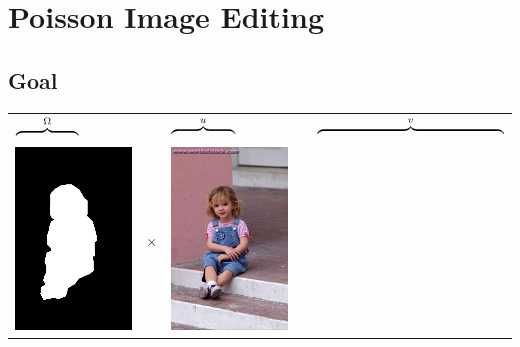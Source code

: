 \documentclass{beamer}
\begin{document}
\section{Poisson Image Editing}

\subsection{Goal}

\begin{frame}
  \begin{center}
    \begin{tabular}{m{1.6cm}m{.6cm}m{1.6cm}m{.6cm}m{4.7cm}}
      $\overbrace{\hspace{1.6cm}}^{\Omega}$ &&
      $\overbrace{\hspace{1.6cm}}^u$ &&
      $\overbrace{\hspace{4.7cm}}^v$ \\
      \includegraphics[scale=.2]{results_poisson/foreground-mask.png}
      & {\Huge$\times$} &
      \includegraphics[scale=.2]{results_poisson/foreground.png}

\end{tabular}
\end{center}
\end{frame}
\end{document}

